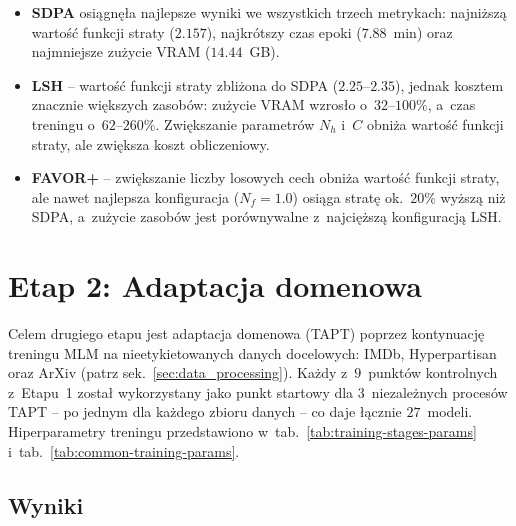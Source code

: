\documentclass[a4paper,11pt,twoside]{report}
\theoremstyle{definition}
\begin{document}
\begin{itemize}
    \item \textbf{SDPA} osiągnęła najlepsze wyniki we wszystkich trzech metrykach: najniższą wartość funkcji straty ($2.157$), najkrótszy czas epoki ($7.88$~min) oraz najmniejsze zużycie VRAM ($14.44$~GB).
    
    \item \textbf{LSH} -- wartość funkcji straty zbliżona do SDPA ($2.25$--$2.35$), jednak kosztem znacznie większych zasobów: zużycie VRAM wzrosło o~$32$--$100\%$, a~czas treningu o~$62$--$260\%$. Zwiększanie parametrów $N_h$ i~$C$ obniża wartość funkcji straty, ale zwiększa koszt obliczeniowy.
    
    \item \textbf{FAVOR+} -- zwiększanie liczby losowych cech obniża wartość funkcji straty, ale nawet najlepsza konfiguracja ($N_f{=}1.0$) osiąga stratę ok.\ $20\%$ wyższą niż SDPA, a~zużycie zasobów jest porównywalne z~najcięższą konfiguracją LSH.
    

\end{itemize}



























\section{Etap 2: Adaptacja domenowa}\label{sec:stage2}

Celem drugiego etapu jest adaptacja domenowa (TAPT) poprzez kontynuację treningu MLM na nieetykietowanych danych docelowych: IMDb, Hyperpartisan oraz ArXiv (patrz sek.~\ref{sec:data_processing}). Każdy z~$9$~punktów kontrolnych z~Etapu~1 został wykorzystany jako punkt startowy dla $3$~niezależnych procesów TAPT -- po jednym dla każdego zbioru danych -- co daje łącznie $27$~modeli. Hiperparametry treningu przedstawiono w~tab.~\ref{tab:training-stages-params} i~tab.~\ref{tab:common-training-params}.

\subsection{Wyniki}
\end{document}
